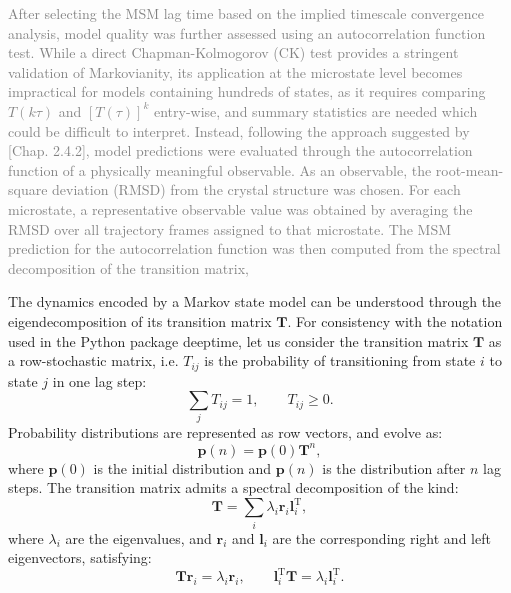 \textcolor{gray}{
After selecting the MSM lag time based on the implied timescale convergence analysis, model quality was further assessed using an autocorrelation function test. 
While a direct Chapman-Kolmogorov (CK) test provides a stringent validation of Markovianity, its application at the microstate level becomes impractical for models containing hundreds of states, 
as it requires comparing $T(k\tau)$ and $[T(\tau)]^k$ entry-wise, and summary statistics are needed which could be difficult to interpret. 
Instead, following the approach suggested by [Chap. 2.4.2]\cite{thebible}, model predictions were evaluated through the autocorrelation function of a physically meaningful observable.
As an observable, the root-mean-square deviation (RMSD) from the crystal structure was chosen. For each microstate, a representative observable value was obtained by averaging the RMSD over all trajectory
frames assigned to that microstate. The MSM prediction for the autocorrelation function was then computed from the spectral decomposition of the transition matrix,
}

\noindent The dynamics encoded by a Markov state model can be understood through the eigendecomposition of its transition matrix $\mathbf{T}$.
For consistency with the notation used in the Python package deeptime, let us consider the transition matrix $\mathbf{T}$ as a row-stochastic matrix, i.e. $T_{ij}$ is the probability of transitioning from state $i$ to state $j$ in one lag step:
\begin{equation*}
    \sum_j T_{ij} = 1, \qquad T_{ij} \geq 0.
\end{equation*}
Probability distributions are represented as row vectors, and evolve as:
\begin{equation*}
\mathbf{p}(n) = \mathbf{p}(0)\mathbf{T}^n,
\end{equation*}
where $\mathbf{p}(0)$ is the initial distribution and $\mathbf{p}(n)$ is the distribution after $n$ lag steps.
The transition matrix admits a spectral decomposition of the kind:
\begin{equation*}
\mathbf{T} = \sum_i \lambda_i \mathbf{r}_i \mathbf{l}_i^{\mathrm T},
\end{equation*}
where $\lambda_i$ are the eigenvalues, and $\mathbf{r}_i$ and $\mathbf{l}_i$ are the corresponding right and left eigenvectors, satisfying:
\begin{equation*}
\mathbf{T}\mathbf{r}_i=\lambda_i\mathbf{r}_i,
\qquad
\mathbf{l}_i^{\mathrm T}\mathbf{T}=\lambda_i\mathbf{l}_i^{\mathrm T}.
\end{equation*}


